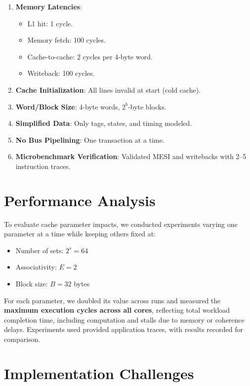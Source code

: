 \documentclass[11pt]{article}
\begin{document}
\begin{enumerate}
    \item \textbf{Memory Latencies}:
        \begin{itemize}
            \item L1 hit: 1 cycle.
            \item Memory fetch: 100 cycles.
            \item Cache-to-cache: 2 cycles per 4-byte word.
            \item Writeback: 100 cycles.
        \end{itemize}
    \item \textbf{Cache Initialization}: All lines invalid at start (cold cache).
    \item \textbf{Word/Block Size}: 4-byte words, $2^b$-byte blocks.
    \item \textbf{Simplified Data}: Only tags, states, and timing modeled.
    \item \textbf{No Bus Pipelining}: One transaction at a time.
    \item \textbf{Microbenchmark Verification}: Validated MESI and writebacks with 2–5 instruction traces.
\end{enumerate}

\section{Performance Analysis}\nopagebreak

To evaluate cache parameter impacts, we conducted experiments varying one parameter at a time while keeping others fixed at:
\begin{itemize}
    \item Number of sets: $2^s = 64$
    \item Associativity: $E = 2$
    \item Block size: $B = 32$ bytes
\end{itemize}

For each parameter, we doubled its value across runs and measured the \textbf{maximum execution cycles across all cores}, reflecting total workload completion time, including computation and stalls due to memory or coherence delays. Experiments used provided application traces, with results recorded for comparison.

\section{Implementation Challenges}\nopagebreak
\end{document}
